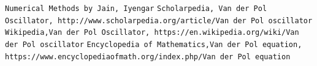 \documentclass{article}
\begin{document}
\begin{thebibliography}{9}
\texttt{Numerical Methods by Jain, Iyengar}
\texttt{Scholarpedia, Van der Pol Oscillator, http://www.scholarpedia.org/article/Van der Pol oscillator}
\texttt{Wikipedia,Van der Pol Oscillator, https://en.wikipedia.org/wiki/Van der Pol oscillator}
\texttt{Encyclopedia of Mathematics,Van der Pol equation, https://www.encyclopediaofmath.org/index.php/Van der Pol equation}
\end{thebibliography}
\end{document}
